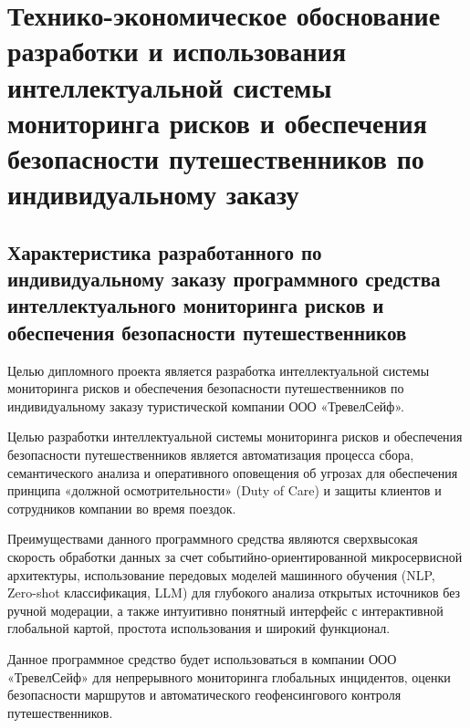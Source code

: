 \section{Технико-экономическое обоснование разработки и использования интеллектуальной системы мониторинга рисков и обеспечения безопасности путешественников по индивидуальному заказу}

\subsection{Характеристика разработанного по индивидуальному заказу программного средства интеллектуального мониторинга рисков и обеспечения безопасности путешественников}

Целью дипломного проекта является разработка интеллектуальной системы мониторинга рисков и обеспечения безопасности путешественников по индивидуальному заказу туристической компании ООО «ТревелСейф».

Целью разработки интеллектуальной системы мониторинга рисков и обеспечения безопасности путешественников является автоматизация процесса сбора, семантического анализа и оперативного оповещения об угрозах для обеспечения принципа «должной осмотрительности» (Duty of Care) и защиты клиентов и сотрудников компании во время поездок.

Преимуществами данного программного средства являются сверхвысокая скорость обработки данных за счет событийно-ориентированной микросервисной архитектуры, использование передовых моделей машинного обучения (NLP, Zero-shot классификация, LLM) для глубокого анализа открытых источников без ручной модерации, а также интуитивно понятный интерфейс с интерактивной глобальной картой, простота использования и широкий функционал.

Данное программное средство будет использоваться в компании ООО «ТревелСейф» для непрерывного мониторинга глобальных инцидентов, оценки безопасности маршрутов и автоматического геофенсингового контроля путешественников.

